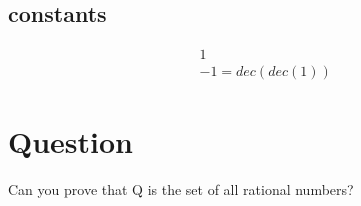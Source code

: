 \documentclass{article}
\begin{document}
\subsection*{constants}
\begin{align*}
&1 \\
&-1 = dec(dec(1))
\end{align*}

\section*{Question}
Can you prove that Q is the set of all rational numbers?
\end{document}
